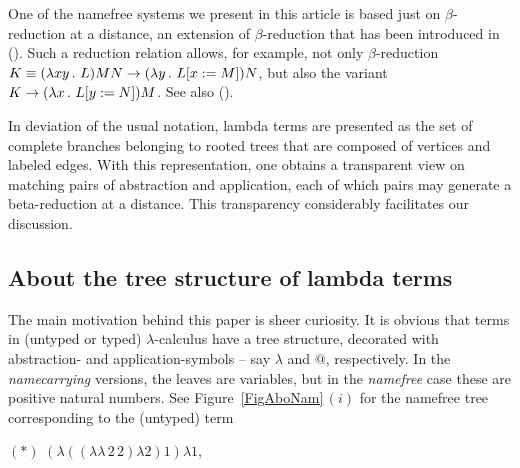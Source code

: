 \documentclass[submission,copyright,creativecommons]{eptcs}
\begin{document}

One of the namefree systems we present in this article
is based just on $\beta$-reduction at a distance,
an extension of $\beta$-reduction that has been introduced in (\cite{Ned73}).
Such a reduction relation allows, for example, not only \mbox{$\beta$-reduction} $K \equiv (\lambda x y \, . \,\, L) M N \rightarrow (\lambda y \, . \,\, L[x := M])N$, but also the variant $K \rightarrow (\lambda x \, . \,\, L[y := N])M$. See also (\cite{Reg92,Reg94}). 


In deviation of the usual notation, lambda terms %
are presented as the set of complete branches belonging to rooted trees that are composed of vertices and labeled edges. With this representation, one obtains a transparent view on matching pairs of abstraction and application, each of which pairs may generate a beta-reduction at a distance. This transparency considerably facilitates our discussion.


\subsection{About the tree structure of lambda terms}
\label{SecAbo}

The main motivation behind this paper is sheer curiosity. It is obvious that terms in (untyped or typed) $\lambda$-calculus have a tree structure, decorated with abstraction- and application-symbols -- say $\lambda$ and $@$, respectively. In the {\em namecarrying\/} versions, the leaves are variables, but in the {\em namefree\/} case these are positive natural numbers. See Figure~\ref{FigAboNam}\,$(i)$ for the namefree tree corresponding to the (untyped) term

\smallskip

$(\ast)$ $(\lambda ((\lambda   \lambda \, 2 \, 2) \lambda  2 ) 1) \lambda  1$,
\end{document}
